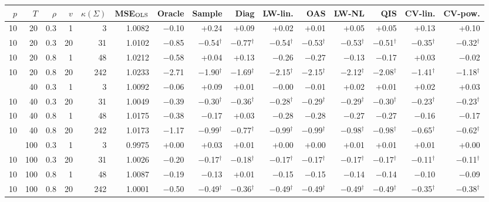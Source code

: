\begin{tabular}{@{}rrrrr rrrrrrrrrr@{}}
\toprule
$p$ & $T$ & $\rho$ & $v$ & $\kappa(\Sigma)$ & MSE$_{\rm OLS}$ & Oracle & Sample & Diag & LW-lin. & OAS & LW-NL & QIS & CV-lin. & CV-pow. \\
\midrule
10 & 20 & 0.3 & 1 & 3 & 1.0082 & $-$0.10 & +0.24 & +0.09 & +0.02 & +0.01 & +0.05 & +0.05 & +0.13 & +0.10 \\
10 & 20 & 0.3 & 20 & 31 & 1.0102 & $-$0.85 & $-$0.54$^{\dagger}$ & $-$0.77$^{\dagger}$ & $-$0.54$^{\dagger}$ & $-$0.53$^{\dagger}$ & $-$0.53$^{\dagger}$ & $-$0.51$^{\dagger}$ & $-$0.35$^{\dagger}$ & $-$0.32$^{\dagger}$ \\
10 & 20 & 0.8 & 1 & 48 & 1.0212 & $-$0.58 & +0.04 & +0.13 & $-$0.26 & $-$0.27 & $-$0.13 & $-$0.17 & +0.03 & $-$0.02 \\
10 & 20 & 0.8 & 20 & 242 & 1.0233 & $-$2.71 & $-$1.90$^{\dagger}$ & $-$1.69$^{\dagger}$ & $-$2.15$^{\dagger}$ & $-$2.15$^{\dagger}$ & $-$2.12$^{\dagger}$ & $-$2.08$^{\dagger}$ & $-$1.41$^{\dagger}$ & $-$1.18$^{\dagger}$ \\
\addlinespace[1pt]
10 & 40 & 0.3 & 1 & 3 & 1.0092 & $-$0.06 & +0.09 & +0.01 & $-$0.00 & $-$0.01 & +0.02 & +0.01 & +0.02 & +0.03 \\
10 & 40 & 0.3 & 20 & 31 & 1.0049 & $-$0.39 & $-$0.30$^{\dagger}$ & $-$0.36$^{\dagger}$ & $-$0.28$^{\dagger}$ & $-$0.29$^{\dagger}$ & $-$0.29$^{\dagger}$ & $-$0.30$^{\dagger}$ & $-$0.23$^{\dagger}$ & $-$0.23$^{\dagger}$ \\
10 & 40 & 0.8 & 1 & 48 & 1.0175 & $-$0.38 & $-$0.17 & +0.03 & $-$0.28 & $-$0.28 & $-$0.27 & $-$0.27 & $-$0.16 & $-$0.17 \\
10 & 40 & 0.8 & 20 & 242 & 1.0173 & $-$1.17 & $-$0.99$^{\dagger}$ & $-$0.77$^{\dagger}$ & $-$0.99$^{\dagger}$ & $-$0.99$^{\dagger}$ & $-$0.98$^{\dagger}$ & $-$0.98$^{\dagger}$ & $-$0.65$^{\dagger}$ & $-$0.62$^{\dagger}$ \\
\addlinespace[1pt]
10 & 100 & 0.3 & 1 & 3 & 0.9975 & +0.00 & +0.03 & +0.01 & +0.00 & +0.00 & +0.01 & +0.01 & +0.01 & +0.00 \\
10 & 100 & 0.3 & 20 & 31 & 1.0026 & $-$0.20 & $-$0.17$^{\dagger}$ & $-$0.18$^{\dagger}$ & $-$0.17$^{\dagger}$ & $-$0.17$^{\dagger}$ & $-$0.17$^{\dagger}$ & $-$0.17$^{\dagger}$ & $-$0.11$^{\dagger}$ & $-$0.11$^{\dagger}$ \\
10 & 100 & 0.8 & 1 & 48 & 1.0087 & $-$0.19 & $-$0.13 & +0.01 & $-$0.15 & $-$0.15 & $-$0.14 & $-$0.14 & $-$0.10 & $-$0.09 \\
10 & 100 & 0.8 & 20 & 242 & 1.0001 & $-$0.50 & $-$0.49$^{\dagger}$ & $-$0.36$^{\dagger}$ & $-$0.49$^{\dagger}$ & $-$0.49$^{\dagger}$ & $-$0.49$^{\dagger}$ & $-$0.49$^{\dagger}$ & $-$0.35$^{\dagger}$ & $-$0.38$^{\dagger}$ \\

\end{tabular}
